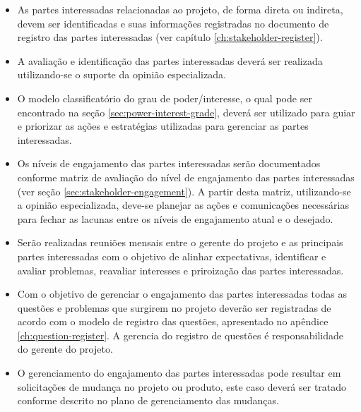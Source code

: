 \begin{itemize}
	\item As partes interessadas relacionadas ao projeto, de forma direta ou indireta, devem ser identificadas e suas informações registradas no documento de registro das partes interessadas (ver capítulo \ref{ch:stakeholder-register}).
	\item A avaliação e identificação das partes interessadas deverá ser realizada utilizando-se o suporte da opinião especializada.
    \item O modelo classificatório do grau de poder/interesse, o qual pode ser encontrado na seção \ref{sec:power-interest-grade}, deverá ser utilizado para guiar e priorizar as ações e estratégias utilizadas para gerenciar as partes interessadas. %
	\item Os níveis de engajamento das partes interessadas serão documentados conforme matriz de avaliação do nível de engajamento das partes interessadas (ver seção \ref{sec:stakeholder-engagement}). A partir desta matriz, utilizando-se a opinião especializada, deve-se planejar as ações e comunicações necessárias para fechar as lacunas entre os níveis de engajamento atual e o desejado.
    \item Serão realizadas reuniões mensais entre o gerente do projeto e as principais partes interessadas com o objetivo de alinhar expectativas, identificar e avaliar problemas, reavaliar interesses e priroização das partes interessadas.
	\item Com o objetivo de gerenciar o engajamento das partes interessadas todas as questões e problemas que surgirem no projeto deverão ser registradas de acordo com o modelo de registro das questões, apresentado no apêndice \ref{ch:question-register}. A gerencia do registro de questões é responsabilidade do gerente do projeto.
	\item O gerenciamento do engajamento das partes interessadas pode resultar em solicitações de mudança no projeto ou produto, este caso deverá ser tratado conforme descrito no plano de gerenciamento das mudanças. 
\end{itemize}

